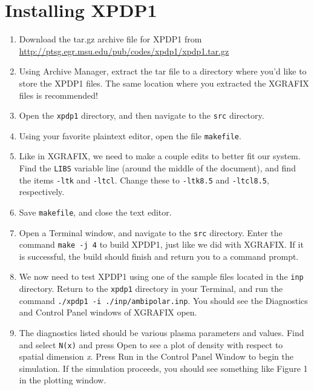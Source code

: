 \documentclass{article}
\begin{document}
	\section{Installing XPDP1}
	
	\begin{enumerate}
		\item Download the tar.gz archive file for XPDP1 from \url{http://ptsg.egr.msu.edu/pub/codes/xpdp1/xpdp1.tar.gz}
		
		\item Using Archive Manager, extract the tar file to a directory where you'd like to store the XPDP1 files. The same location where you extracted the XGRAFIX files is recommended!
		
		\item Open the \verb|xpdp1| directory, and then navigate to the \verb|src| directory.
		
		\item Using your favorite plaintext editor, open the file \verb|makefile|. 
		
		\item Like in XGRAFIX, we need to make a couple edits to better fit our system. Find the \verb|LIBS| variable line (around the middle of the document), and find the items \verb|-ltk| and \verb|-ltcl|. Change these to \verb|-ltk8.5| and \verb|-ltcl8.5|, respectively. 
		
		\item Save \verb|makefile|, and close the text editor.
		
		\item Open a Terminal window, and navigate to the \verb|src| directory. Enter the command \verb|make -j 4| to build XPDP1, just like we did with XGRAFIX. If it is successful, the build should finish and return you to a command prompt. 
		
		\item We now need to test XPDP1 using one of the sample files located in the \verb|inp| directory. Return to the \verb|xpdp1| directory in your Terminal, and run the command \verb|./xpdp1 -i ./inp/ambipolar.inp|. You should see the Diagnostics and Control Panel windows of XGRAFIX open.
		
		\item The diagnostics listed should be various plasma parameters and values. Find and select \verb|N(x)| and press Open to see a plot of density with respect to spatial dimension \textit{x}. Press Run in the Control Panel Window to begin the simulation. If the simulation proceeds, you should see something like Figure 1 in the plotting window. 
		

\end{enumerate}
\end{document}
